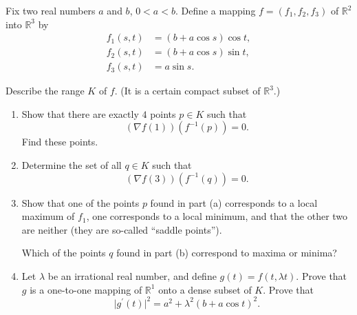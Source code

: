 	\begin{exercise}[Rudin 9.12]
		Fix two real numbers $a$ and $b$, $0<a<b$. Define a mapping $f=(f_1,f_2,f_3)$ of $\mathbb{R}^2$ into $\mathbb{R}^3$ by
		\begin{align}
			f_1(s,t) &= (b+a\cos s)\cos t, \\
			f_2(s,t) &= (b+a\cos s)\sin t, \\
			f_3(s,t) &= a\sin s.
		\end{align}

		Describe the range $K$ of $f$. (It is a certain compact subset of $\mathbb{R}^3$.)

		\begin{enumerate}[label=(\alph*)]
			\item Show that there are exactly $4$ points $p\in K$ such that
			\begin{equation}
				(\nabla f(1))(f^{-1}(p))=0.
			\end{equation}
			Find these points.

			\item Determine the set of all $q\in K$ such that
			\begin{equation}
				(\nabla f(3))(f^{-1}(q))=0.
			\end{equation}

			\item Show that one of the points $p$ found in part (a) corresponds to a local maximum of $f_1$, one corresponds to a local minimum, and that the other two are neither (they are so-called ``saddle points'').

			Which of the points $q$ found in part (b) correspond to maxima or minima?

			\item Let $\lambda$ be an irrational real number, and define $g(t)=f(t,\lambda t)$. Prove that $g$ is a one-to-one mapping of $\mathbb{R}^1$ onto a dense subset of $K$. Prove that
			\begin{equation}
				\lvert g^\prime(t)\rvert^2
				=
				a^2+\lambda^2(b+a\cos t)^2.
			\end{equation}
		\end{enumerate}
	\end{exercise}

